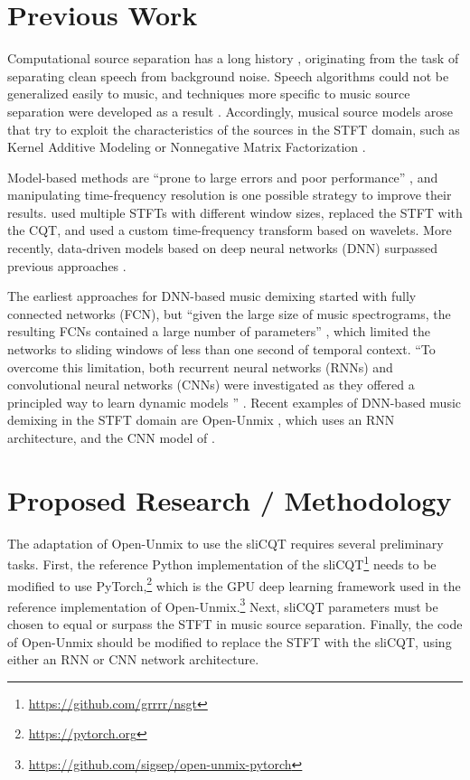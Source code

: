 \documentclass[letter,12pt]{article}
\begin{document}
\section{Previous Work}

Computational source separation has a long history \parencite{musicsepgood}, originating from the task of separating clean speech from background noise. Speech algorithms could not be generalized easily to music, and techniques more specific to music source separation were developed as a result \parencite{musicsepintro1}. Accordingly, musical source models arose that try to exploit the characteristics of the sources in the STFT domain, such as Kernel Additive Modeling or Nonnegative Matrix Factorization \parencite{musicsepgood}.

Model-based methods are ``prone to large errors and poor performance'' \parencite[13]{musicsepintro1}, and manipulating time-frequency resolution is one possible strategy to improve their results. \textcite{driedger} used multiple STFTs with different window sizes, \textcite{fitzgerald2} replaced the STFT with the CQT, and \textcite{wavelets} used a custom time-frequency transform based on wavelets. More recently, data-driven models based on deep neural networks (DNN) surpassed previous approaches \parencite{sisec2018, musicsepintro1}.

The earliest approaches for DNN-based music demixing started with fully connected networks (FCN), but ``given the large size of music spectrograms, the resulting FCNs contained a large number of parameters'' \parencite[15]{musicsepgood}, which limited the networks to sliding windows of less than one second of temporal context. ``To overcome this limitation, both recurrent neural networks (RNNs) and convolutional neural networks (CNNs) were investigated as they offered a principled way to learn dynamic models '' \parencite[15]{musicsepgood}. Recent examples of DNN-based music demixing in the STFT domain are Open-Unmix \parencite{umx}, which uses an RNN architecture, and the CNN model of \textcite{plumbley2}.

\section{Proposed Research / Methodology}

The adaptation of Open-Unmix to use the sliCQT requires several preliminary tasks. First, the reference Python implementation of the sliCQT\footnote{\url{https://github.com/grrrr/nsgt}} needs to be modified to use PyTorch,\footnote{\url{https://pytorch.org}} which is the GPU deep learning framework used in the reference implementation of Open-Unmix.\footnote{\url{https://github.com/sigsep/open-unmix-pytorch}} Next, sliCQT parameters must be chosen to equal or surpass the STFT in music source separation. Finally, the code of Open-Unmix should be modified to replace the STFT with the sliCQT, using either an RNN or CNN network architecture.
\end{document}
